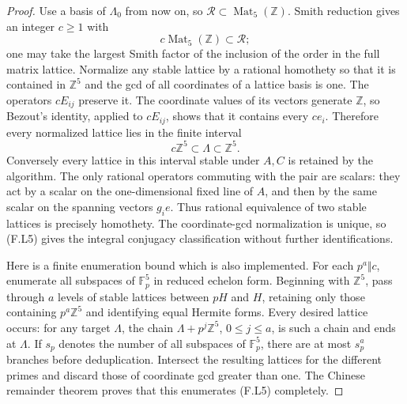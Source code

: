 \begin{proof}
Use a basis of $\Lambda_0$ from now on, so
$\mathcal R\subset\operatorname{Mat}_5(\mathbb Z)$.
Smith reduction gives an integer $c\ge1$ with
\[
 c\operatorname{Mat}_5(\mathbb Z)\subset\mathcal R;
 \tag{F.L4}
\]
one may take the largest Smith factor of the inclusion
of the order in the full matrix lattice.
Normalize any stable lattice by a rational homothety so
that it is contained in $\mathbb Z^5$ and the gcd of all
coordinates of a lattice basis is one.
The operators $cE_{ij}$ preserve it.  The coordinate values
of its vectors generate $\mathbb Z$, so Bezout's identity,
applied to $cE_{ij}$, shows that it contains every $ce_i$.
Therefore every normalized lattice lies in the finite interval
\[
 c\mathbb Z^5\subset\Lambda\subset\mathbb Z^5.
 \tag{F.L5}
\]
Conversely every lattice in this interval stable under
$A,C$ is retained by the algorithm.
The only rational operators commuting with the pair are
scalars: they act by a scalar on the one-dimensional fixed
line of $A$, and then by the same scalar on the spanning
vectors $g_ie$.  Thus rational equivalence of two stable
lattices is precisely homothety.  The coordinate-gcd
normalization is unique, so (F.L5) gives the integral
conjugacy classification without further identifications.

Here is a finite enumeration bound which is also implemented.
For each $p^a\Vert c$, enumerate all subspaces of
$\mathbb F_p^5$ in reduced echelon form.
Beginning with $\mathbb Z^5$, pass through $a$ levels of
stable lattices between $pH$ and $H$, retaining only those
containing $p^a\mathbb Z^5$ and identifying equal Hermite
forms.  Every desired lattice occurs: for any target
$\Lambda$, the chain
$\Lambda+p^j\mathbb Z^5$, $0\le j\le a$, is such a
chain and ends at $\Lambda$.
If $s_p$ denotes the number of all subspaces of
$\mathbb F_p^5$, there are at most $s_p^a$ branches before
deduplication.  Intersect the resulting lattices for the
different primes and discard those of coordinate gcd
greater than one.  The Chinese remainder theorem proves
that this enumerates (F.L5) completely.


\end{proof}
